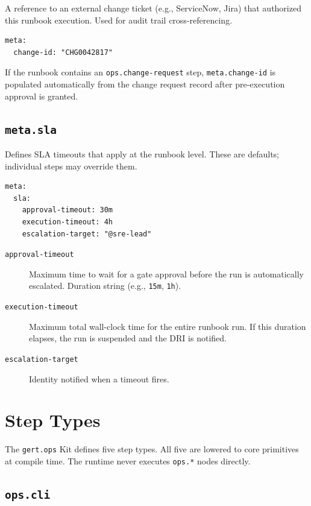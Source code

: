 A reference to an external change ticket (e.g., ServiceNow, Jira) that authorized this
runbook execution. Used for audit trail cross-referencing.

\begin{verbatim}
meta:
  change-id: "CHG0042817"
\end{verbatim}

If the runbook contains an \texttt{ops.change-request} step, \texttt{meta.change-id} is
populated automatically from the change request record after pre-execution approval is granted.

\subsection{\texttt{meta.sla}}

Defines SLA timeouts that apply at the runbook level. These are defaults; individual steps
may override them.

\begin{verbatim}
meta:
  sla:
    approval-timeout: 30m
    execution-timeout: 4h
    escalation-target: "@sre-lead"
\end{verbatim}

\begin{description}
  \item[\texttt{approval-timeout}] Maximum time to wait for a gate approval before the run
    is automatically escalated. Duration string (e.g., \texttt{15m}, \texttt{1h}).
  \item[\texttt{execution-timeout}] Maximum total wall-clock time for the entire runbook run.
    If this duration elapses, the run is suspended and the DRI is notified.
  \item[\texttt{escalation-target}] Identity notified when a timeout fires.
\end{description}

\section{Step Types}
\label{sec:schema-step-types}

The \texttt{gert.ops} Kit defines five step types. All five are lowered to core primitives at
compile time. The runtime never executes \texttt{ops.*} nodes directly.

\subsection{\texttt{ops.cli}}

